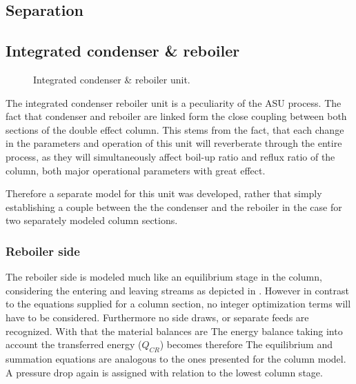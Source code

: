 \subsection{Separation}
\label{sec:mathpro:steady:sep}
    

 \subsection{Integrated condenser \& reboiler}
    \label{sec:mathpro:steady:conreb}
        \begin{figure}
            \center
            
            \caption{Integrated condenser \& reboiler unit.}
            \label{fig:mathpro:conreb_ss}
        \end{figure}

        The integrated condenser reboiler unit is a peculiarity of the ASU process. The fact that condenser and 
        reboiler are linked form the close coupling between both sections of the double effect column. 
        This stems from the fact, that each change in the parameters and operation of this unit will reverberate 
        through the entire process, as they will simultaneously affect boil-up ratio and reflux
        ratio of the column, both major operational parameters with great effect. 
        
        Therefore a separate model for this unit was developed, rather that simply establishing a couple between the
        the condenser and the reboiler in the case for two separately modeled column sections.

        \subsubsection{Reboiler side}
            The reboiler side is modeled much like an equilibrium stage in the column, considering the entering 
            and leaving streams as depicted in . However in contrast to the 
            equations supplied for a column section, no integer optimization terms will have to be considered. 
            Furthermore no side draws, or separate feeds are recognized. With that the material balances are
            The energy balance taking into account the transferred energy ($Q_{CR}$) becomes therefore
            The equilibrium and summation equations are analogous to the ones presented for the column model.
            A pressure drop again is assigned with relation to the lowest column stage.

